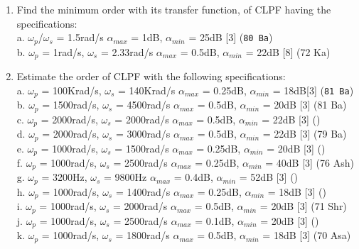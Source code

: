 \documentclass[12pt]{article}
\newcommand{\w}{\(\omega\)}
\begin{document}
\begin{enumerate}
\item Find the minimum order with its transfer function, of CLPF having the specifications:\\
a. \w$_p$/\w$_s$ = 1.5rad/s \hspace{5.8cm}
$\alpha_{max}$ = 1dB, $\alpha_{min}$ = 25dB \hfill [3] (\texttt{80 Ba})\\ 
b. \w$_p$ = 1rad/s, \w$_s$ = 2.33rad/s \hspace{3.7cm}
$\alpha_{max}$ = 0.5dB, $\alpha_{min}$ = 22dB \hfill[8] (72 Ka)

\item Estimate the order of CLPF with the following specifications:\\
a. \w$_p$ = 100Krad/s, \w$_s$ = 140Krad/s \hspace{2.8cm}
$\alpha_{max}$ = 0.25dB, $\alpha_{min}$ = 18dB\hfill [3] (\texttt{81 Ba})\\
b. \w$_p$ = 1500rad/s, \w$_s$ = 4500rad/s \hspace{3cm}
$\alpha_{max}$ = 0.5dB, $\alpha_{min}$ = 20dB \hfill[3] (81 Ba)\\
c. \w$_p$ = 2000rad/s, \w$_s$ = 2000rad/s \hspace{30.5mm}
$\alpha_{max}$ = 0.5dB, $\alpha_{min}$ = 22dB \hfill[3] ()\\
d. \w$_p$ = 2000rad/s, \w$_s$ = 3000rad/s \hspace{3cm}
$\alpha_{max}$ = 0.5dB, $\alpha_{min}$ = 22dB \hfill[3] (79 Ba)\\
e. \w$_p$ = 1000rad/s, \w$_s$ = 1500rad/s \hspace{30.5mm}
$\alpha_{max}$ = 0.25dB, $\alpha_{min}$ = 20dB \hfill[3] ()\\
f. \w$_p$ = 1000rad/s, \w$_s$ = 2500rad/s \hspace{3.1cm}
$\alpha_{max}$ = 0.25dB, $\alpha_{min}$ = 40dB \hfill[3] (76 Ash)\\
g. \w$_p$ = 3200Hz, \w$_s$ = 9800Hz \hspace{3.95cm}
$\alpha_{max}$ = 0.4dB, $\alpha_{min}$ = 52dB \hfill[3] ()\\
h. \w$_p$ = 1000rad/s, \w$_s$ = 1400rad/s \hspace{3cm}
$\alpha_{max}$ = 0.25dB, $\alpha_{min}$ = 18dB \hfill[3] ()\\
i. \w$_p$ = 1000rad/s, \w$_s$ = 2000rad/s \hspace{3.1cm}
$\alpha_{max}$ = 0.5dB, $\alpha_{min}$ = 20dB \hfill[3] (71 Shr)\\
j. \w$_p$ = 1000rad/s, \w$_s$ = 2500rad/s \hspace{3.1cm}
$\alpha_{max}$ = 0.1dB, $\alpha_{min}$ = 20dB \hfill[3] ()\\
k. \w$_p$ = 1000rad/s, \w$_s$ = 1800rad/s \hspace{3cm}
$\alpha_{max}$ = 0.5dB, $\alpha_{min}$ = 18dB \hfill[3] (70 Asa)


\end{enumerate}
\end{document}

